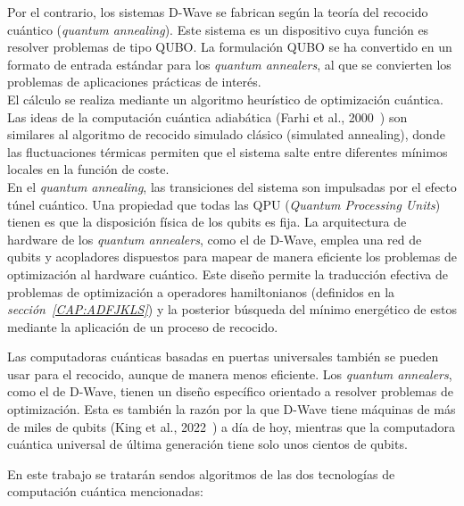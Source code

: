 Por el contrario, los sistemas D-Wave se fabrican según la teoría del recocido cuántico (\textit{quantum annealing}).
Este sistema es un dispositivo cuya función es resolver problemas de tipo QUBO\@.
La formulación QUBO se ha convertido en un formato de entrada estándar para los \textit{quantum annealers}, al que se convierten los problemas de aplicaciones prácticas de interés.
\\
El cálculo se realiza mediante un algoritmo heurístico de optimización cuántica.
Las ideas de la computación cuántica adiabática (Farhi et al., 2000~\cite{aqc}) son similares al algoritmo de recocido simulado clásico (simulated annealing), donde las fluctuaciones térmicas permiten que el sistema salte entre diferentes mínimos locales en la función de coste.
\\
En el \textit{quantum annealing}, las transiciones del sistema son impulsadas por el efecto túnel cuántico.
Una propiedad que todas las QPU (\textit{Quantum Processing Units}) tienen es que la disposición física de los qubits es fija.
La arquitectura de hardware de los \textit{quantum annealers}, como el de D-Wave, emplea una red de qubits y acopladores dispuestos para mapear de manera eficiente los problemas de optimización al hardware cuántico.
Este diseño permite la traducción efectiva de problemas de optimización a operadores hamiltonianos (definidos en la \textit{sección~\ref{CAP:ADFJKLS}}) y la posterior búsqueda del mínimo energético de estos mediante la aplicación de un proceso de recocido.

Las computadoras cuánticas basadas en puertas universales también se pueden usar para el recocido, aunque de manera menos eficiente.
Los \textit{quantum annealers}, como el de D-Wave, tienen un diseño específico orientado a resolver problemas de optimización.
Esta es también la razón por la que D-Wave tiene máquinas de más de miles de qubits (King et al., 2022~\cite{2000_dwave-King_2022}) a día de hoy, mientras que la computadora cuántica universal de última generación tiene solo unos cientos de qubits\cite{ibm_roadmap}.

En este trabajo se tratarán sendos algoritmos de las dos tecnologías de computación cuántica mencionadas:

